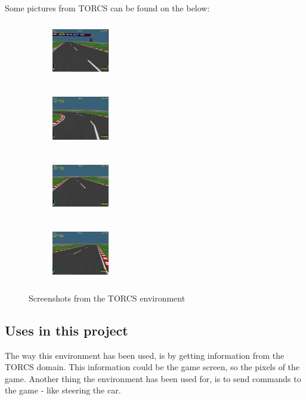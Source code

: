 Some pictures from TORCS can be found on  the below:
\begin{figure} [H]
	\centering
	\begin{subfigure}{.20\textwidth}
		\centering
		\includegraphics[width=25mm, height=25mm]{Figures/Architecture/Torcs/torcs_2.png}
	\end{subfigure}
	\begin{subfigure}{.20\textwidth}
	\centering
	\includegraphics[width=25mm, height=25mm]{Figures/Architecture/Torcs/torcs_3.png}
    \end{subfigure}
	\begin{subfigure}{.20\textwidth}
	\centering
	\includegraphics[width=25mm, height=25mm]{Figures/Architecture/Torcs/torcs_4.png}
	\end{subfigure}
	\begin{subfigure}{.20\textwidth}
	\centering
	\includegraphics[width=25mm, height=25mm]{Figures/Architecture/Torcs/torcs_5.png}
	\end{subfigure}
	\caption{Screenshots from the TORCS environment}
	\label{fig:torcs_screenshots}
\end{figure}
      
\subsection{Uses in this project}      
The way this environment has been used, is by getting information from the TORCS domain. This information could be the game screen, so the pixels of the game. Another thing the environment has been used for, is to send commands to the game - like steering the car. 

